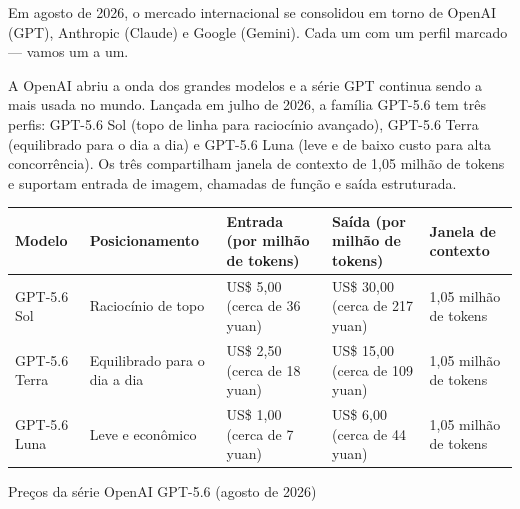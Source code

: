 


Em agosto de 2026, o mercado internacional se consolidou em torno de OpenAI (GPT), Anthropic (Claude) e Google (Gemini). Cada um com um perfil marcado — vamos um a um.


A OpenAI abriu a onda dos grandes modelos e a série GPT continua sendo a mais usada no mundo. Lançada em julho de 2026, a família GPT-5.6 tem três perfis: GPT-5.6 Sol (topo de linha para raciocínio avançado), GPT-5.6 Terra (equilibrado para o dia a dia) e GPT-5.6 Luna (leve e de baixo custo para alta concorrência). Os três compartilham janela de contexto de 1,05 milhão de tokens e suportam entrada de imagem, chamadas de função e saída estruturada.

\begin{center}
\begin{tabularx}{\linewidth}{|X|X|X|X|X|}
\hline
\textbf{Modelo} & \textbf{Posicionamento} & \textbf{Entrada (por milhão de tokens)} & \textbf{Saída (por milhão de tokens)} & \textbf{Janela de contexto} \tabularnewline
\hline
GPT-5.6 Sol & Raciocínio de topo & US\$ 5,00 (cerca de 36 yuan) & US\$ 30,00 (cerca de 217 yuan) & 1,05 milhão de tokens \tabularnewline
GPT-5.6 Terra & Equilibrado para o dia a dia & US\$ 2,50 (cerca de 18 yuan) & US\$ 15,00 (cerca de 109 yuan) & 1,05 milhão de tokens \tabularnewline
GPT-5.6 Luna & Leve e econômico & US\$ 1,00 (cerca de 7 yuan) & US\$ 6,00 (cerca de 44 yuan) & 1,05 milhão de tokens \tabularnewline
\hline
\end{tabularx}
\end{center}

\begin{center}\small\color{gray}Preços da série OpenAI GPT-5.6 (agosto de 2026)\end{center}

